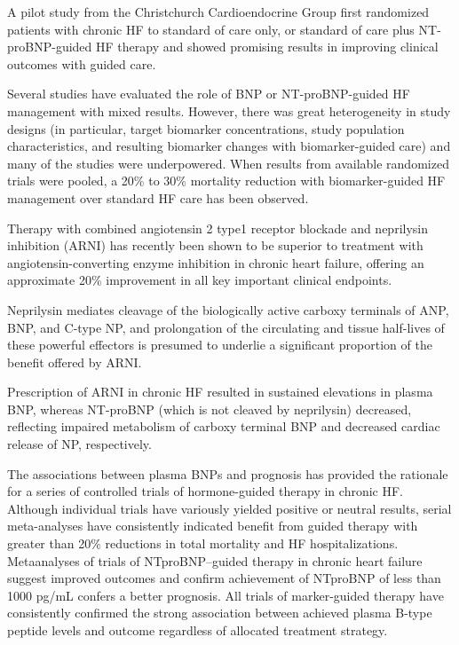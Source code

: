 \documentclass[14pt,a4paper,onecolumn]{extarticle}
\begin{document}
A pilot study from the Christchurch Cardioendocrine Group first randomized patients with chronic HF to standard of care only, or standard of care plus NT-proBNP-guided HF therapy and showed promising results in improving clinical outcomes with guided care. \citep{Troughton2000}

Several studies have evaluated the role of BNP or NT-proBNP-guided HF management with mixed results. However, there was great heterogeneity in study designs (in particular, target biomarker concentrations, study population characteristics, and resulting biomarker changes with biomarker-guided care) and many of the studies were underpowered. When results from available randomized trials were pooled, a 20\% to 30\% mortality reduction with biomarker-guided HF management over standard HF care has been observed. \citep{Porapakkham2010}

Therapy with combined angiotensin 2 type1 receptor blockade and neprilysin inhibition (ARNI) has recently been shown to be superior to treatment with angiotensin-converting enzyme inhibition in chronic heart failure, offering an approximate 20\% improvement in all key important clinical endpoints. \citep{McMurray2014}

Neprilysin mediates cleavage of the biologically active carboxy terminals of ANP, BNP, and C-type NP, and prolongation of the circulating and tissue half-lives of these powerful effectors is presumed to underlie a significant proportion of the benefit offered by ARNI. \citep{Bayes-Genis2016}

Prescription of ARNI in chronic HF resulted in sustained elevations in plasma BNP, whereas NT-proBNP (which is not cleaved by neprilysin) decreased, reflecting impaired metabolism of carboxy terminal BNP and decreased cardiac release of NP, respectively. \citep{Packer2015}

The associations between plasma BNPs and prognosis has provided the rationale for a series of controlled trials of hormone-guided therapy in chronic HF. Although individual trials have variously yielded positive or neutral results, serial meta-analyses have consistently indicated benefit from guided therapy with greater than 20\% reductions in total mortality and HF hospitalizations. Metaanalyses of trials of NTproBNP–guided therapy in chronic heart failure suggest improved outcomes and confirm achievement of NTproBNP of less than 1000 pg/mL confers a better prognosis. All trials of marker-guided therapy have consistently confirmed the strong association between achieved plasma B-type  peptide levels and outcome regardless of allocated treatment strategy. \citep{Troughton2014}
\end{document}
